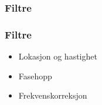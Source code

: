 \documentclass[xcolor=table]{beamer}
\begin{document}
\subsubsection{Filtre}
\begin{frame}
  \frametitle{Filtre}
  \begin{itemize}
    \item Lokasjon og hastighet
    \item Fasehopp
    \item Frekvenskorreksjon
  \end{itemize}
\end{frame}
\end{document}
